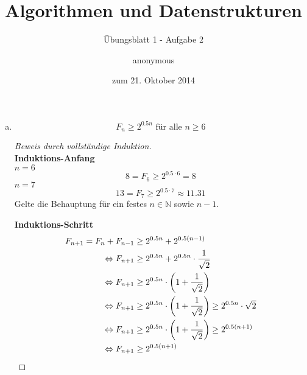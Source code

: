 \documentclass[a4paper]{scrartcl}
\title{Algorithmen und Datenstrukturen}
\subtitle{Übungsblatt 1 - Aufgabe 2}
\author{
    anonymous
}
\date{zum 21. Oktober 2014}
\begin{document}
\maketitle

\begin{enumerate}[(a)]
    \item
        \begin{behaupt}
            \begin{equation}
                F_n \geq 2^{\num{0,5}n} \text{ für alle } n \geq 6
            \end{equation}
        \end{behaupt}
        \begin{proof}[Beweis durch vollständige Induktion] \hfill \\
            \textbf{Induktions-Anfang} \\
            $n = 6$
            \begin{equation}
                8 = F_6 \geq 2^{\num{0.5} \cdot 6} = 8
            \end{equation}
            $n = 7$
            \begin{equation}
                13 = F_7 \geq 2^{\num{0.5} \cdot 7} \approx \num{11,31}
            \end{equation}
            Gelte die Behauptung für ein festes $n \in \mathbb{N}$ sowie $n-1$.

            \textbf{Induktions-Schritt} \\
            \begin{equation}
                \begin{split}
                    F_{n+1} = F_{n} + F_{n-1} &\geq 2^{\num{0,5}n} + 2^{\num{0,5}(n-1)} \\
                    \Leftrightarrow F_{n+1} &\geq 2^{\num{0,5}n} + 2^{\num{0,5}n} \cdot \frac{1}{\sqrt{2}} \\
                    \Leftrightarrow F_{n+1} &\geq 2^{\num{0,5}n} \cdot \left( 1 + \frac{1}{\sqrt{2}} \right) \\
                    \Leftrightarrow F_{n+1} &\geq 2^{\num{0,5}n} \cdot \left( 1 + \frac{1}{\sqrt{2}} \right)  \geq 2^{\num{0,5}n} \cdot \sqrt{2} \\
                    \Leftrightarrow F_{n+1} &\geq 2^{\num{0,5}n} \cdot \left( 1 + \frac{1}{\sqrt{2}} \right)  \geq 2^{\num{0,5}(n+1)} \\
                    \Leftrightarrow F_{n+1} &\geq  2^{\num{0,5}(n+1)}
                \end{split}
            \end{equation}
        \end{proof}


\end{enumerate}
\end{document}
